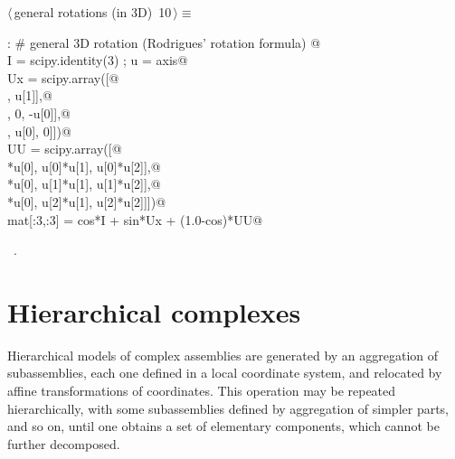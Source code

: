 \documentclass[11pt,oneside]{article}	%
\begin{document}
\begin{flushleft} \small \label{scrap23}
\protect{}$\langle\,$general rotations (in 3D)\nobreak\ {\footnotesize 10}$\,\rangle\equiv$
\vspace{-1ex}
\begin{list}{}{} \item
\mbox{}\verb@else:    # general 3D rotation (Rodrigues' rotation formula)   @\\
\mbox{}\verb@   I = scipy.identity(3) ; u = axis@\\
\mbox{}\verb@   Ux = scipy.array([@\\
\mbox{}\verb@      [0,      -u[2],    u[1]],@\\
\mbox{}\verb@      [u[2],      0,    -u[0]],@\\
\mbox{}\verb@      [-u[1],   u[0],      0]])@\\
\mbox{}\verb@   UU = scipy.array([@\\
\mbox{}\verb@      [u[0]*u[0], u[0]*u[1],  u[0]*u[2]],@\\
\mbox{}\verb@      [u[1]*u[0], u[1]*u[1],  u[1]*u[2]],@\\
\mbox{}\verb@      [u[2]*u[0], u[2]*u[1],  u[2]*u[2]]])@\\
\mbox{}\verb@   mat[:3,:3] = cos*I + sin*Ux + (1.0-cos)*UU@\\
\mbox{}\verb@@{\NWsep}
\end{list}
\vspace{-1ex}
\footnotesize\addtolength{\baselineskip}{-1ex}
\begin{list}{}{\setlength{\itemsep}{-\parsep}\setlength{\itemindent}{-\leftmargin}}
\item \NWtxtMacroRefIn\ .
\end{list}
\end{flushleft}
\section{Hierarchical complexes}
Hierarchical models of complex assemblies are generated by an aggregation
of subassemblies, each one defined in a local coordinate system, and
relocated by affine transformations of coordinates.  This operation
may be repeated hierarchically, with some subassemblies defined by
aggregation of simpler parts, and so on, until one obtains a set of
elementary components, which cannot be further decomposed.
\end{document}
